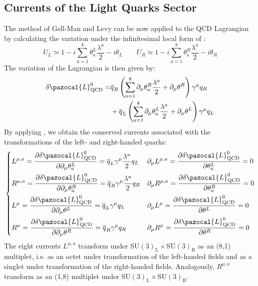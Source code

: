 \documentclass[../main.tex]{subfiles}
\begin{document}
\subsection{Currents of the Light Quarks Sector}
The method of Gell-Man and Levy can be now applied to the QCD Lagrangian by calculating the variation under the infinitesimal local form of :
\[
U_{L}\simeq1-i\sum_{a=1}^8\theta_a^{L}\frac{\lambda^a}{2}-i\theta_{L} \qquad U_{R}\simeq1-i\sum_{a=1}^8\theta_a^{R}\frac{\lambda^a}{2}-i\theta_{R}
\]
The variation of the Lagrangian is then given by:
\begin{align*}    
\delta\pazocal{L}_{\text{QCD}}^0=&\overline{q}_R\left(\sum_{a=1}^8\partial_\mu\theta_a^R\frac{\lambda^a}{2}+\partial_\mu\theta^R\right)\gamma^\mu q_R\\
&+\overline{q}_L\left(\sum_{a=1}^8\partial_\mu\theta_a^L\frac{\lambda^a}{2}+\partial_\mu\theta^L\right)\gamma^\mu q_L
\end{align*}
By applying , we obtain the conserved currents associated with the transformations of the left- and right-handed quarks:
\[
\left\{
\begin{aligned}
&L^{\mu,a}=\frac{\partial\delta\pazocal{L}^0_{\text{QCD}}}{\partial\partial_\mu\theta_a^L}=\overline{q}_L\gamma^\mu\frac{\lambda^a}{2}q_L &&\partial_\mu L^{\mu,a}=\frac{\partial\delta\pazocal{L}^0_{\text{QCD}}}{\partial\theta_a^L}=0\\
&R^{\mu,a}=\frac{\partial\delta\pazocal{L}^0_{\text{QCD}}}{\partial\partial_\mu\theta_a^R}=\overline{q}_R\gamma^\mu\frac{\lambda^a}{2}q_R &&\partial_\mu R^{\mu,a}=\frac{\partial\delta\pazocal{L}^0_{\text{QCD}}}{\partial\theta_a^R}=0\\
&L^{\mu}=\frac{\partial\delta\pazocal{L}^0_{\text{QCD}}}{\partial\partial_\mu\theta^L}=\overline{q}_L\gamma^\mu q_L &&\partial_\mu L^{\mu}=\frac{\partial\delta\pazocal{L}^0_{\text{QCD}}}{\partial\theta^L}=0\\
&R^{\mu}=\frac{\partial\delta\pazocal{L}^0_{\text{QCD}}}{\partial\partial_\mu\theta^R}=\overline{q}_R\gamma^\mu q_R &&\partial_\mu R^{\mu}=\frac{\partial\delta\pazocal{L}^0_{\text{QCD}}}{\partial\theta^R}=0
\end{aligned}
\right.
\]
The eight currents $L^{\mu,a}$ transform under SU$(3)_{\text{L}}\times$SU$(3)_{\text{R}}$ as an (8,1) multiplet, i.e. as an octet under transformation of the left-handed fields and as a singlet under transformation of the right-handed fields. Analogously, $R^{\mu,a}$ transform as an (1,8) multiplet under SU$(3)_{\text{L}}\times$SU$(3)_{\text{R}}$.\\
\end{document}
